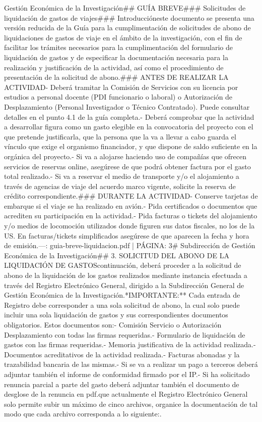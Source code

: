 \documentclass{article}
\begin{document}
\begin{itemize}
Gestión Económica de la Investigación\n\n## GUÍA BREVE\n### Solicitudes de liquidación de gastos de viajes\n\n### Introducción\n\nEn este documento se presenta una versión reducida de la Guía para la cumplimentación de solicitudes de abono de liquidaciones de gastos de viaje en el ámbito de la investigación, con el fin de facilitar los trámites necesarios para la cumplimentación del formulario de liquidación de gastos y de especificar la documentación necesaria para la realización y justificación de la actividad, así como el procedimiento de presentación de la solicitud de abono.\n\n### ANTES DE REALIZAR LA ACTIVIDAD\n\n- Deberá tramitar la Comisión de Servicios con su licencia por estudios a personal docente (PDI funcionario o laboral) o Autorización de Desplazamiento (Personal Investigador o Técnico Contratado). Puede consultar detalles en el punto 4.1 de la guía completa.\n\n- Deberá comprobar que la actividad a desarrollar figura como un gasto elegible en la convocatoria del proyecto con el que pretende justificarla, que la persona que la va a llevar a cabo guarda el vínculo que exige el organismo financiador, y que dispone de saldo suficiente en la orgánica del proyecto.\n\n- Si va a alojarse haciendo uso de compañías que ofrecen servicios de reservas online, asegúrese de que podrá obtener factura por el gasto total realizado.\n\n- Si va a reservar el medio de transporte y/o el alojamiento a través de agencias de viaje del acuerdo marco vigente, solicite la reserva de crédito correspondiente.\n\n### DURANTE LA ACTIVIDAD\n\n- Conserve tarjetas de embarque si el viaje se ha realizado en avión.\n- Pida certificados o documentos que acrediten su participación en la actividad.\n- Pida facturas o tickets del alojamiento y/o medios de locomoción utilizados donde figuren sus datos fiscales, no los de la US. En facturas/tickets simplificados asegúrese de que aparecen la fecha y hora de emisión.\n\n---\n\nFUENTE: guia-breve-liquidacion.pdf | PÁGINA: 3\n# Subdirección de Gestión Económica de la Investigación\n\n## 3. SOLICITUD DEL ABONO DE LA LIQUIDACIÓN DE GASTOS\n\nA continuación, deberá proceder a la solicitud de abono de la liquidación de los gastos realizados mediante instancia efectuada a través del Registro Electrónico General, dirigido a la Subdirección General de Gestión Económica de la Investigación.\n\n**IMPORTANTE:** Cada entrada de Registro debe corresponder a una sola solicitud de abono, la cual solo puede incluir una sola liquidación de gastos y sus correspondientes documentos obligatorios. Estos documentos son:\n\n- Comisión Servicio o Autorización Desplazamiento con todas las firmas requeridas.\n- Formulario de liquidación de gastos con las firmas requeridas.\n- Memoria justificativa de la actividad realizada.\n- Documentos acreditativos de la actividad realizada.\n- Facturas abonadas y la trazabilidad bancaria de las mismas.\n- Si se va a realizar un pago a terceros deberá adjuntar también el informe de conformidad firmado por el IP.\n- Si ha solicitado renuncia parcial a parte del gasto deberá adjuntar también el documento de desglose de la renuncia en pdf.\n\nDado que actualmente el Registro Electrónico General solo permite subir un máximo de cinco archivos, organice la documentación de tal modo que cada archivo corresponda a lo siguiente:\n{}. 
\end{itemize}
\end{document}
